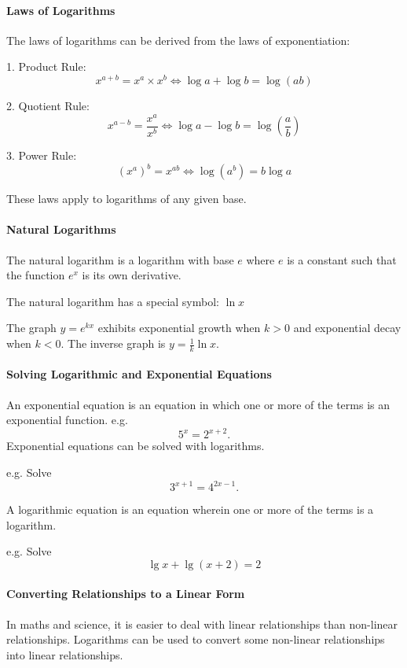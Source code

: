 \paragraph{Laws of Logarithms}

The laws of logarithms can be derived from the laws of exponentiation:

1. Product Rule:
   $$
   x^{a+b} = x^a \times x^b \iff \log a + \log b = \log(ab)
   $$

2. Quotient Rule:
   $$
   x^{a-b} = \frac{x^a}{x^b} \iff \log a - \log b = \log\left(\frac{a}{b}\right)
   $$

3. Power Rule:
   $$
   (x^a)^b = x^{ab} \iff \log(a^b) = b \log a
   $$

These laws apply to logarithms of any given base.

\paragraph{Natural Logarithms}

The natural logarithm is a logarithm with base $e$ where $e$ is a constant such that the function $e^x$ is its own derivative.

The natural logarithm has a special symbol: $\ln x$

The graph $y = e^{kx}$ exhibits exponential growth when $k > 0$ and exponential decay when $k < 0$. The inverse graph is $y = \frac{1}{k} \ln x$. 

\paragraph{Solving Logarithmic and Exponential Equations}

An exponential equation is an equation in which one or more of the terms is an exponential function. e.g. 
$$
5^x = 2^{x+2}.
$$
Exponential equations can be solved with logarithms.

e.g. Solve 
$$
3^{x+1} = 4^{2x-1}.
$$

A logarithmic equation is an equation wherein one or more of the terms is a logarithm.

e.g. Solve 
$$
\lg x + \lg(x+2) = 2
$$

\paragraph{Converting Relationships to a Linear Form}

In maths and science, it is easier to deal with linear relationships than non-linear relationships. Logarithms can be used to convert some non-linear relationships into linear relationships.

